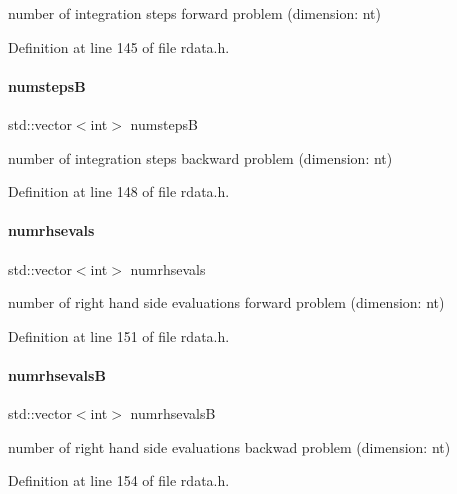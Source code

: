 number of integration steps forward problem (dimension\+: nt) 

Definition at line 145 of file rdata.\+h.

\mbox{\label{classamici_1_1_return_data_ae0fffbefbc18d93f2ceecc4547a70566}} 
\paragraph{\texorpdfstring{numstepsB}{numstepsB}}
{\footnotesize\ttfamily std\+::vector$<$int$>$ numstepsB}

number of integration steps backward problem (dimension\+: nt) 

Definition at line 148 of file rdata.\+h.

\mbox{\label{classamici_1_1_return_data_a22235e961356f32e211f9b5d8499ad3b}} 
\paragraph{\texorpdfstring{numrhsevals}{numrhsevals}}
{\footnotesize\ttfamily std\+::vector$<$int$>$ numrhsevals}

number of right hand side evaluations forward problem (dimension\+: nt) 

Definition at line 151 of file rdata.\+h.

\mbox{\label{classamici_1_1_return_data_aa0eda2ffc8979d9e46d8fb2d8d3a1622}} 
\paragraph{\texorpdfstring{numrhsevalsB}{numrhsevalsB}}
{\footnotesize\ttfamily std\+::vector$<$int$>$ numrhsevalsB}

number of right hand side evaluations backwad problem (dimension\+: nt) 

Definition at line 154 of file rdata.\+h.


